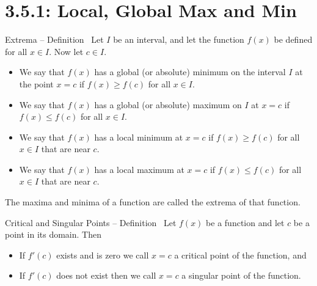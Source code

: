 \section*{3.5.1: Local, Global Max and Min}
%
\begin{frame}[t]
\begin{block}{Extrema -- Definition~}
Let $I$ be an interval, and let the function $f(x)$ be defined for all $x \in I$. Now let $c\in I$. 
\begin{itemize}
\item  We say that $f(x)$ has a \alert{global (or absolute)
minimum on the interval $I$} at the point $x=c$ if $f(x)\ge f(c)$ for all $x\in I$.
\item We say that $f(x)$ has a \alert{global (or absolute)
maximum on $I$} at $x=c$ if $f(x)\le f(c)$ for all $x\in I$.
\item We say that $f(x)$ has a \alert{local minimum at $x=c$}
if $f(x)\ge f(c)$ for all $x\in I$ that are near $c$. 
\item We say that $f(x)$ has a \alert{local maximum at $x=c$} if $f(x)\le f(c)$ for all $x\in I$ that are near $c$. 
\end{itemize}
The maxima and minima of a function are called the \alert{extrema} of that function.
\end{block}
\end{frame}
\begin{frame}
\begin{block}{Critical and Singular Points -- Definition~}
Let $f(x)$ be a function and let $c$ be a point in its domain. Then
\begin{itemize}
\item If $f'(c)$ exists and is zero we call $x=c$ a \alert{critical point} of the function, and
\item If $f'(c)$ does not exist then we call $x=c$ a \alert{singular point} of the function.
\end{itemize}
\end{block}
\end{frame}

